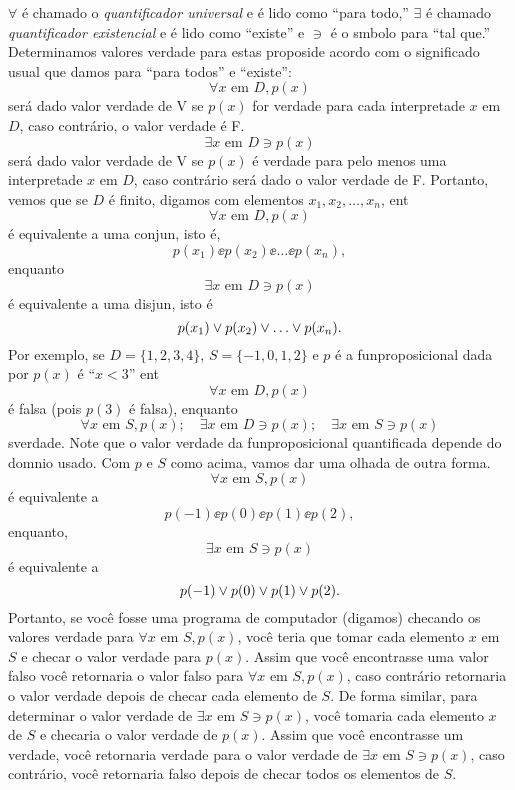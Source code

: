 $\forall$ \'e chamado o {\it quantificador universal} e \'e lido como ``para todo,'' $\exists$ \'e chamado {\it quantificador existencial} e \'e lido como ``existe'' e $\ni$ \'e o s\ih mbolo para ``tal que.'' Determinamos valores verdade para estas proposi\coes de acordo com o significado usual que damos para ``para todos'' e ``existe'':
\[
\forall x \textrm{ em } D, p(x)
\] 
ser\'a dado valor verdade de V se $p(x)$ for verdade para cada interpreta\cao de $x$ em $D$, caso contr\'ario, o valor verdade \'e F.
\[
\exists x \textrm{ em } D \ni p(x)
\] 
ser\'a dado valor verdade de V se $p(x)$ \'e verdade para pelo menos uma interpreta\cao de $x$ em $D$, caso contr\'ario ser\'a dado o valor verdade de F. Portanto, vemos que se $D$ \'e finito, digamos com elementos $x_1,x_2,\ldots,x_n$, ent\ao
\[
\forall x \textrm{ em } D, p(x)
\] 
\'e equivalente a uma conjun\caoi, isto \'e,
\[
p(x_1)\ee p(x_2)\ee \ldots \ee p(x_n),
\]
enquanto
\[
\exists x \textrm{ em } D \ni p(x)
\]
\'e equivalente a uma disjun\caoi, isto \'e
\[
p(x_1)\vee p(x_2)\vee \ldots \vee p(x_n).
\]
Por exemplo, se $D=\{1,2,3,4\}$, $S=\{-1,0,1,2\}$ e $p$ \'e a fun\cao proposicional dada por $p(x)$ \'e ``$x<3$'' ent\ao 
\[
\forall x \textrm{ em } D, p(x)
\]
\'e falsa (pois $p(3)$ \'e falsa), enquanto
\[
\forall x \textrm{ em } S, p(x); \quad \exists x \textrm{ em } D \ni p(x); \quad \exists x \textrm{ em } S \ni p(x) 
\]
s\ao verdade. Note que o valor verdade da fun\cao proposicional quantificada depende do dom\ih nio usado. Com $p$ e $S$ como acima, vamos dar uma olhada de outra forma.
\[
\forall x \textrm{ em } S, p(x)
\]
\'e equivalente a
\[
p(-1)\ee p(0)\ee p(1) \ee p(2),
\]
enquanto,
\[
\exists x \textrm{ em } S \ni p(x)
\]
\'e equivalente a
\[
p(-1)\vee p(0)\vee p(1) \vee p(2).
\]
Portanto, se voc\^e fosse uma programa de computador (digamos) checando os valores verdade para $\forall x \textrm{ em } S, p(x)$, voc\^e teria que tomar cada elemento $x$ em $S$ e checar o valor verdade para $p(x)$. Assim que voc\^e encontrasse uma valor falso voc\^e retornaria o valor falso para $\forall x \textrm{ em } S, p(x)$, caso contr\'ario retornaria o valor verdade depois de checar cada elemento de $S$. De forma similar, para determinar o valor verdade de $\exists x \textrm{ em } S \ni p(x)$, voc\^e tomaria cada elemento $x$ de $S$ e checaria o valor verdade de $p(x)$. Assim que voc\^e encontrasse um verdade, voc\^e retornaria verdade para o valor verdade de $\exists x \textrm{ em } S \ni p(x)$, caso contr\'ario, voc\^e retornaria falso depois de checar todos os elementos de $S$.

